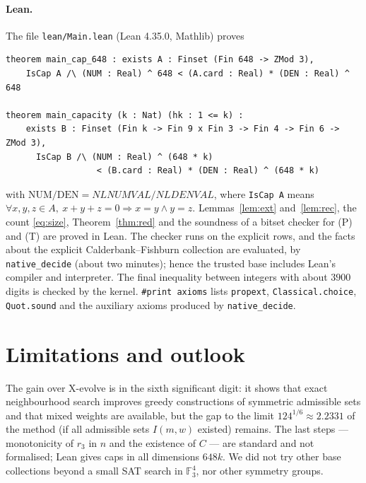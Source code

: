 \documentclass[11pt]{article}
\numberwithin{equation}{section}
\theoremstyle{definition}
\theoremstyle{remark}
\newcommand{\F}{\mathbb F}
\newcommand{\NLNUM}{NLNUMVAL}
\newcommand{\NLDEN}{NLDENVAL}
\begin{document}
\paragraph{Lean.}  The file \texttt{lean/Main.lean} (Lean 4.35.0, Mathlib) proves
\begin{verbatim}
theorem main_cap_648 : exists A : Finset (Fin 648 -> ZMod 3),
    IsCap A /\ (NUM : Real) ^ 648 < (A.card : Real) * (DEN : Real) ^ 648

theorem main_capacity (k : Nat) (hk : 1 <= k) :
    exists B : Finset (Fin k -> Fin 9 x Fin 3 -> Fin 4 -> Fin 6 -> ZMod 3),
      IsCap B /\ (NUM : Real) ^ (648 * k)
                  < (B.card : Real) * (DEN : Real) ^ (648 * k)
\end{verbatim}
with $\mathrm{NUM}/\mathrm{DEN}=\NLNUM/\NLDEN$, where \texttt{IsCap A} means
$\forall x,y,z\in A,\ x+y+z=0\Rightarrow x=y\wedge y=z$.  Lemmas~\ref{lem:ext} and~\ref{lem:rec}, the
count \eqref{eq:size}, Theorem~\ref{thm:red} and the soundness of a bitset checker for (P) and (T) are
proved in Lean.  The checker runs on the explicit rows, and the facts about the explicit
Calderbank--Fishburn collection are evaluated, by \texttt{native\_decide} (about two minutes); hence the
trusted base includes Lean's compiler and interpreter.  The final inequality between integers with about
$3900$ digits is checked by the kernel.  \texttt{\#print axioms} lists \texttt{propext},
\texttt{Classical.choice}, \texttt{Quot.sound} and the auxiliary axioms produced by \texttt{native\_decide}.

\section{Limitations and outlook}
The gain over X-evolve is in the sixth significant digit: it shows that exact neighbourhood search
improves greedy constructions of symmetric admissible sets and that mixed weights are available, but the
gap to the limit $124^{1/6}\approx2.2331$ of the method \cite{Tyrrell} (if all admissible sets
$I(m,w)$ existed) remains.  The last steps --- monotonicity of $r_3$ in $n$ and the existence of $C$ ---
are standard and not formalised; Lean gives caps in all dimensions $648k$.  We did not try other base
collections beyond a small SAT search in $\F_3^4$, nor other symmetry groups.
\end{document}

